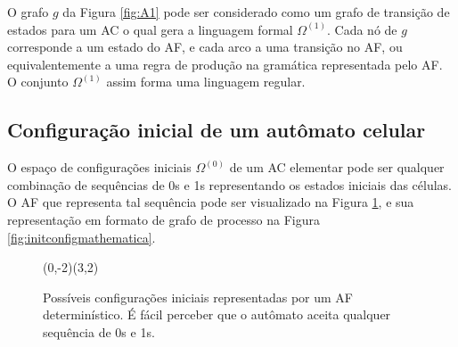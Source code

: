 \documentclass[12pt,a4paper]{article}
\begin{document}
O grafo $g$ da Figura \ref{fig:A1} pode ser considerado como um grafo
de transição de estados para um AC o qual gera a linguagem
formal $\Omega^{(1)}$. Cada nó de $g$ corresponde a um estado do
AF, e cada arco a uma transição no AF, ou
equivalentemente a uma regra  de produção na gramática representada pelo
AF. O conjunto $\Omega^{(1)}$ assim forma uma linguagem
regular.

\subsection{Configuração inicial de um autômato celular}

O espaço de configurações iniciais $\Omega^{(0)}$ de um AC
elementar pode ser qualquer combinação de sequências de 0s e 1s
representando os estados iniciais das células. O AF
que representa tal sequência pode ser visualizado na Figura
\ref{fig:initconfigautomaton}, e sua representação em formato de
grafo de processo na Figura \ref{fig:initconfigmathematica}.

\begin{figure}[htp]
\begin{center}
\begin{VCPicture}{(0,-2)(3,2)}
\end{VCPicture}
\caption{Possíveis configurações iniciais representadas por um AF
determinístico. É fácil perceber que o autômato aceita qualquer sequência de
0s e 1s.}
\label{fig:initconfigautomaton}
\end{center}
\end{figure}
\end{document}
